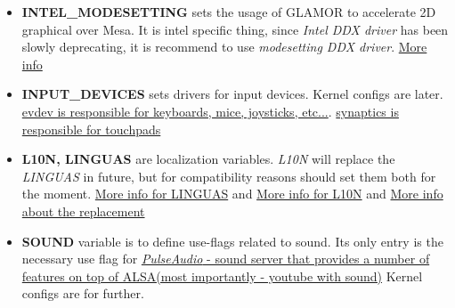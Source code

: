 \documentclass[10pt,a4paper]{article}
\begin{document}
\begin{itemize}

                
                \item \textbf{INTEL\_MODESETTING} sets the usage of GLAMOR to accelerate 2D graphical over Mesa. It is intel specific thing, since \textit{Intel DDX driver} has been slowly deprecating, it is recommend to use \textit{modesetting DDX driver}. \href{https://wiki.gentoo.org/wiki/Intel#Modesetting_DDX}{More info}
                

                
                \item \textbf{INPUT\_DEVICES} sets drivers for input devices. Kernel configs are later. \href{https://wiki.gentoo.org/wiki/Evdev#Driver}{evdev is responsible for keyboards, mice, joysticks, etc...}. \href{https://wiki.gentoo.org/wiki/Synaptics#Driver}{synaptics is responsible for touchpads}
                

                
                \item \textbf{L10N, LINGUAS} are localization variables. \textit{L10N} will replace the \textit{LINGUAS} in future, but for compatibility reasons should set them both for the moment. \href{https://wiki.gentoo.org/wiki/Localization/Guide#LINGUAS}{More info for LINGUAS} and \href{https://wiki.gentoo.org/wiki/Localization/Guide#L10N}{More info for L10N} and \href{https://www.gentoo.org/support/news-items/2016-06-23-l10n-use_expand.html}{More info about the replacement}
                

                
                \item \textbf{SOUND} variable is to define use-flags related to sound. Its only entry is the necessary use flag for \href{https://wiki.gentoo.org/wiki/PulseAudio#Software}{\textit{PulseAudio} - sound server that provides a number of features on top of ALSA(most importantly - youtube with sound)} Kernel configs are for further. 
                

                   

\end{itemize}
\end{document}
